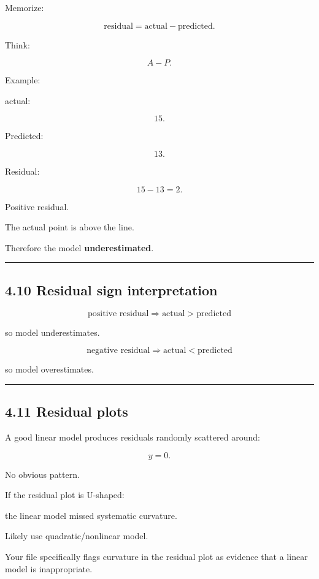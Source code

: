 \documentclass[
]{article}
\begin{document}
Memorize:

\[
\boxed{\text{residual}=\text{actual}-\text{predicted}}.
\]

Think:

\[
\boxed{A-P}.
\]

Example:

actual:

\[
15.
\]

Predicted:

\[
13.
\]

Residual:

\[
15-13=2.
\]

Positive residual.

The actual point is above the line.

Therefore the model \textbf{underestimated}.

\begin{center}\rule{0.5\linewidth}{0.5pt}\end{center}

\subsection{4.10 Residual sign
interpretation}\label{residual-sign-interpretation}

\[
\boxed{\text{positive residual}
\Rightarrow
\text{actual}>\text{predicted}}
\]

so model underestimates.

\[
\boxed{\text{negative residual}
\Rightarrow
\text{actual}<\text{predicted}}
\]

so model overestimates.

\begin{center}\rule{0.5\linewidth}{0.5pt}\end{center}

\subsection{4.11 Residual plots}\label{residual-plots}

A good linear model produces residuals randomly scattered around:

\[
y=0.
\]

No obvious pattern.

If the residual plot is U-shaped:

the linear model missed systematic curvature.

Likely use quadratic/nonlinear model.

Your file specifically flags curvature in the residual plot as evidence
that a linear model is inappropriate.
\end{document}
